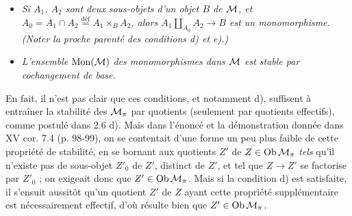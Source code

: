 
\begin{itemize}[leftmargin=4em]
\item[\textit{e)}] \textit{Si $A_1$, $A_2$ sont deux sous-objets d'un objet $B$ de $\mathcal{M}$, et $A_0 = A_1 \cap A_2 \overset{\text{déf}}{=} A_1 \times_B A_2$, alors $A_1 \amalg_{A_0} A_2 \longrightarrow B$ est un monomorphisme. (Noter la proche parenté des conditions d) et e).)}
\item[\textit{f)}] \textit{L'ensemble} $\mathrm{Mon}(\mathcal{M})$ \textit{des monomorphismes dans $\mathcal{M}$ est stable par cochangement de base.}
\end{itemize}
En fait, il n'est pas clair que ces conditions, et notamment d), suffisent à entraîner la stabilité des $\mathcal{M}_{\pi}$ par quotients (seulement par quotients effectifs), comme postulé dans 2.6 d). Mais dans l'énoncé et la démonstration donnée dans XV cor. 7.4 (p. 98-99), on se contentait d'une forme un peu plus faible de cette propriété de stabilité, en se bornant aux quotients $Z'$ de $Z \in \mathrm{Ob}\,\mathcal{M}_{\pi}$ \textit{tels} qu'il n'existe pas de sous-objet $Z'_0$ de $Z'$, distinct de $Z'$, et tel que $Z \longrightarrow Z'$ se factorise par $Z'_0$ ; on exigeait donc que $Z' \in \mathrm{Ob}\,\mathcal{M}_{\pi}$. Mais si la condition d) est satisfaite, il s'ensuit aussitôt qu'un quotient $Z'$ de $Z$ ayant cette propriété supplémentaire est nécessairement effectif, d'où résulte bien que $Z' \in \mathrm{Ob}\,\mathcal{M}_{\pi}$.


